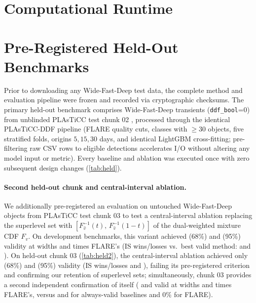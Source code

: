 \FloatBarrier
\section{Computational Runtime}
\label{app:runtime}


\FloatBarrier
\section{Pre-Registered Held-Out Benchmarks}
\label{app:held}
Prior to downloading any Wide-Fast-Deep test data, the complete method and evaluation pipeline were frozen and recorded via cryptographic checksums.
The primary held-out benchmark comprises Wide-Fast-Deep transients (\texttt{ddf\_bool}=0) from unblinded PLAsTiCC test chunk 02 \citep{kessler2019models}, processed through the identical PLAsTiCC-DDF pipeline (FLARE quality cuts, classes with $\ge30$ objects, five stratified folds, origins $5,15,30$ days, and identical LightGBM cross-fitting; pre-filtering raw CSV rows to eligible detections accelerates I/O without altering any model input or metric).
Every baseline and ablation was executed once with zero subsequent design changes (\cref{tab:held}).


\paragraph{Second held-out chunk and central-interval ablation.}
We additionally pre-registered an evaluation on untouched Wide-Fast-Deep objects from PLAsTiCC test chunk 03 to test a central-interval ablation replacing the superlevel set with $[F_{\hat v}^{-1}(t),\,F_{\hat v}^{-1}(1-t)]$ of the dual-weighted mixture CDF $F_v$.
On development benchmarks, this variant achieved \QValidSixtyeight{} (68\%) and \QValidNinetyfive{} (95\%) validity at widths \QWidthSixtyeight{} and \QWidthNinetyfive{} times FLARE's (IS wins/losses vs.\ best valid method: \QISSixtyeight{} and \QISNinetyfive{}).
On held-out chunk 03 (\cref{tab:held2}), the central-interval ablation achieved only \QHeldValidSixtyeight{} (68\%) and \QHeldValidNinetyfive{} (95\%) validity (IS wins/losses \QHeldISSixtyeight{} and \QHeldISNinetyfive{}), failing its pre-registered criterion and confirming our retention of superlevel sets; simultaneously, chunk 03 provides a second independent confirmation of \gamut{} itself (\HeldBValidGamutSixtyeight{} and \HeldBValidGamutNinetyfive{} valid at widths \HeldBWidthGamutSixtyeight{} and \HeldBWidthGamutNinetyfive{} times FLARE's, versus \HeldBWidthValidSixtyeight{} and \HeldBWidthValidNinetyfive{} for always-valid baselines and 0\% for FLARE).


